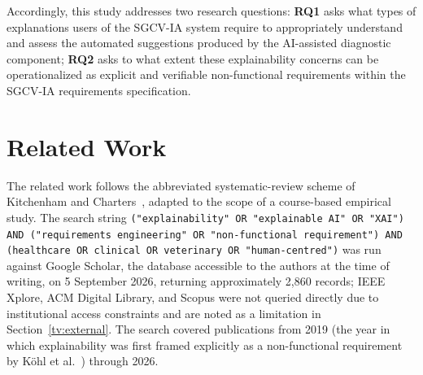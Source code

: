 \documentclass[pdflatex,sn-mathphys-num,Numbered]{sn-jnl}
\begin{document}
Accordingly, this study addresses two research questions: \textbf{RQ1} asks what types of explanations users of the SGCV-IA system require to appropriately understand and assess the automated suggestions produced by the AI-assisted diagnostic component; \textbf{RQ2} asks to what extent these explainability concerns can be operationalized as explicit and verifiable non-functional requirements within the SGCV-IA requirements specification.


\section{Related Work}\label{sec2}

The related work follows the abbreviated systematic-review scheme of Kitchenham and Charters~\cite{kitchenham2007}, adapted to the scope of a course-based empirical study. The search string \texttt{("explainability" OR "explainable AI" OR "XAI") AND ("requirements engineering" OR "non-functional requirement") AND (healthcare OR clinical OR veterinary OR "human-centred")} was run against Google Scholar, the database accessible to the authors at the time of writing, on 5 September 2026, returning approximately 2,860 records; IEEE Xplore, ACM Digital Library, and Scopus were not queried directly due to institutional access constraints and are noted as a limitation in Section~\ref{tv:external}. The search covered publications from 2019 (the year in which explainability was first framed explicitly as a non-functional requirement by Köhl et al.~\cite{kohl2019}) through 2026.
\end{document}
